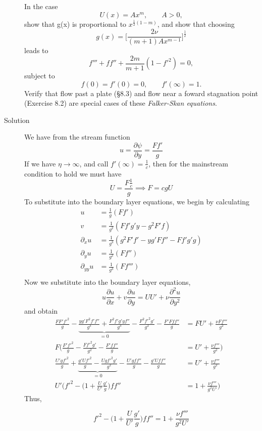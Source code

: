 \documentclass[11pt]{article}
\newcommand{\eq}[1]{\begin{align*}#1\end{align*}}
\newcommand{\eqn}[2]{
  \begin{equation}
    \label{#1}
    #2
  \end{equation}
}
\newcommand{\fp}[2]{\frac{\partial#1}{\partial#2}}
\newcommand{\fpp}[2]{\frac{\partial^2 #1}{\partial#2^2}}
\newcommand{\p}[1]{\partial_{#1}}
\begin{document}
\begin{description}
In the case
$$
  U(x) = Ax^m,
  \qquad
  A > 0,
$$
show that g(x) is proportional to $x^{\frac{1}{2}(1-m)}$, and show that choosing
$$
  g(x)
  =
  \bigg[
  \frac{2\nu}{(m+1)Ax^{m-1}}
  \bigg]^{\frac{1}{2}}
$$
leads to
$$
  f''' + ff'' + \frac{2m}{m+1}(1-f'^2) = 0,
$$
subject to
$$
  f(0) = f'(0) = 0,
  \qquad
  f'(\infty) = 1.
$$
Verify that flow past a plate (\S 8.3) and flow near a foward stagnation point
(Exercise 8.2) are special cases of these \emph{Falker-Skan equations}.
\item[Solution]
We have from the stream function
$$
  u = \fp{\psi}{y} = \frac{F f'}{g}
$$
If we have $\eta \rightarrow \infty$, and call $f'(\infty) = \frac{1}{c}$, then
for the mainstream condition to hold we must have
$$
  U = \frac{F\frac{1}{c}}{g}
  \implies
  F = cgU
$$
To substitute into the boundary layer equations, we begin by calculating
\eq{
  u &= \frac{1}{g}\left( Ff' \right) \\
  v &= \frac{1}{g^2}\left(Ff'g'y - g^2F'f \right) \\
  \p{x}u &= \frac{1}{g^3}\left( g^2F'f' - yg'Ff'' - Ff'g'g \right) \\
  \p{y}u &= \frac{1}{g^2}\left( F f'' \right) \\
  \p{yy}u &= \frac{1}{g^3}\left( F f''' \right) \\
}
Now we substitute into the boundary layer equations,
$$
  u \fp{u}{x} + v\fp{u}{y} = UU' + \nu\fpp{u}{y}
$$
and obtain
\eq{
  \frac{FF'f'^2}{g}
  - \underbrace{
  \frac{yg'F^2f'f''}{g^3}
  + \frac{F^2f'g'yf''}{g^3}
  }_{=0}
  - \frac{F^2f'^2 g'}{g^2}
  - \frac{F'Fff''}{g}
  &=
  FU'
  + \frac{\nu Ff'''}{g^2}
  \\
%
%
  F\bigg(
  \frac{F'f'^2}{g}
  - \frac{Ff'^2 g'}{g^2}
  - \frac{F'ff''}{g}
  &=
  U'
  + \frac{\nu f'''}{g^2}
  \bigg)
  \\
%
%
  \frac{U'gf'^2}{g}
  + \underbrace{
  \frac{g'Uf'^2}{g}
  - \frac{Ugf'^2 g'}{g^2}
  }_{=0}
  - \frac{U'gff''}{g}
  - \frac{g'Uff''}{g}
  &=
  U'
  + \frac{\nu f'''}{g^2}
  \\
%
%
  U'\bigg(
  f'^2
  - \big(
  1
  + \frac{U}{U'}\frac{g'}{g}
  \big) ff''
  &=
  1
  + \frac{\nu f'''}{g^2U'}
  \bigg)
%
%
}
Thus,
\eqn{main_equation}{
  f'^2
  - \bigg(
  1
  + \frac{U}{U'}\frac{g'}{g}
  \bigg) ff''
  =
  1
  + \frac{\nu f'''}{g^2U'}
}


\end{description}
\end{document}
